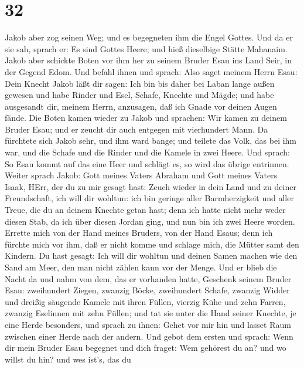 \hypertarget{section-31}{%
\section{32}\label{section-31}}

 Jakob aber zog seinen Weg; und es begegneten ihm die Engel
Gottes.  Und da er sie sah, sprach er: Es sind Gottes Heere;
und hieß dieselbige Stätte Mahanaim.  Jakob aber schickte
Boten vor ihm her zu seinem Bruder Esau ins Land Seir, in der Gegend
Edom.  Und befahl ihnen und sprach: Also saget meinem Herrn
Esau: Dein Knecht Jakob läßt dir sagen: Ich bin bis daher bei Laban
lange außen gewesen  und habe Rinder und Esel, Schafe,
Knechte und Mägde; und habe ausgesandt dir, meinem Herrn, anzusagen, daß
ich Gnade vor deinen Augen fände.  Die Boten kamen wieder zu
Jakob und sprachen: Wir kamen zu deinem Bruder Esau; und er zeucht dir
auch entgegen mit vierhundert Mann.  Da fürchtete sich Jakob
sehr, und ihm ward bange; und teilete das Volk, das bei ihm war, und die
Schafe und die Rinder und die Kamele in zwei Heere.  Und
sprach: So Esau kommt auf das eine Heer und schlägt es, so wird das
übrige entrinnen.  Weiter sprach Jakob: Gott meines Vaters
Abraham und Gott meines Vaters Isaak, HErr, der du zu mir gesagt hast:
Zeuch wieder in dein Land und zu deiner Freundschaft, ich will dir
wohltun:  ich bin geringe aller Barmherzigkeit und aller
Treue, die du an deinem Knechte getan hast; denn ich hatte nicht mehr
weder diesen Stab, da ich über diesen Jordan ging, und nun bin ich zwei
Heere worden.  Errette mich von der Hand meines Bruders,
von der Hand Esaus; denn ich fürchte mich vor ihm, daß er nicht komme
und schlage mich, die Mütter samt den Kindern.  Du hast
gesagt: Ich will dir wohltun und deinen Samen machen wie den Sand am
Meer, den man nicht zählen kann vor der Menge.  Und er
blieb die Nacht da und nahm von dem, das er vorhanden hatte, Geschenk
seinem Bruder Esau:  zweihundert Ziegen, zwanzig Böcke,
zweihundert Schafe, zwanzig Widder  und dreißig säugende
Kamele mit ihren Füllen, vierzig Kühe und zehn Farren, zwanzig Eselinnen
mit zehn Füllen;  und tat sie unter die Hand seiner
Knechte, je eine Herde besonders, und sprach zu ihnen: Gehet vor mir hin
und lasset Raum zwischen einer Herde nach der andern.  Und
gebot dem ersten und sprach: Wenn dir mein Bruder Esau begegnet und dich
fraget: Wem gehörest du an? und wo willst du hin? und wes ist's, das du
